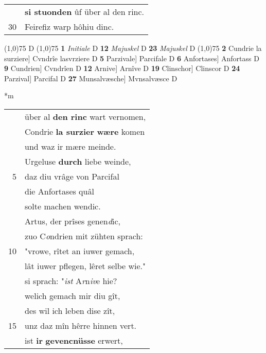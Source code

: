 \documentclass[8pt,a4paper,notitlepage]{article}
\begin{document}
\begin{table}[ht]
\begin{minipage}[t]{0.5\linewidth}
\begin{tabular}{rl}
 & \textbf{si stuonden} ûf über al den rinc.\\ 
30 & Feirefiz warp hôhiu dinc.\\ 
\end{tabular}
\scriptsize
\line(1,0){75} \newline
D \newline
\line(1,0){75} \newline
\textbf{1} \textit{Initiale} D  \textbf{12} \textit{Majuskel} D  \textbf{23} \textit{Majuskel} D  \newline
\line(1,0){75} \newline
\textbf{2} Cundrie la surziere] Cvndrîe lasvrziere D \textbf{5} Parzivale] Parcifale D \textbf{6} Anfortases] Anfortass D \textbf{9} Cundrien] Cvndrîen D \textbf{12} Arnive] Arnîve D \textbf{19} Clinschor] Clinscor D \textbf{24} Parzival] Parcifal D \textbf{27} Munsalvæsche] Mvnsalvæsce D \newline
\end{minipage}
\hspace{0.5cm}
\begin{minipage}[t]{0.5\linewidth}
\small
\begin{center}*m
\end{center}
\begin{tabular}{rl}
 & über al \textbf{den rinc} wart vernomen,\\ 
 & Condrie \textbf{la surzier} \textbf{wære} komen\\ 
 & und waz ir mære meinde.\\ 
 & Urgeluse \textbf{durch} liebe weinde,\\ 
5 & daz diu vrâge von Parcifal\\ 
 & die Anfortases quâl\\ 
 & solte machen wendic.\\ 
 & Artus, der prîses genen\textit{d}ic,\\ 
 & zuo C\textit{o}ndrien mit zühten sprach:\\ 
10 & "vrowe, rîtet an iuwer gemach,\\ 
 & lât iuwer pflegen, lêret selbe wie."\\ 
 & si sprach: "\textit{ist} A\textit{r}n\textit{iv}e hie?\\ 
 & welich gemach mir diu gît,\\ 
 & des wil ich leben dise zît,\\ 
15 & unz daz mîn hêrre hinnen vert.\\ 
 & ist \textbf{ir} \textbf{gevencnüsse} erwert,\\ 

\end{tabular}
\end{minipage}
\end{table}
\end{document}
